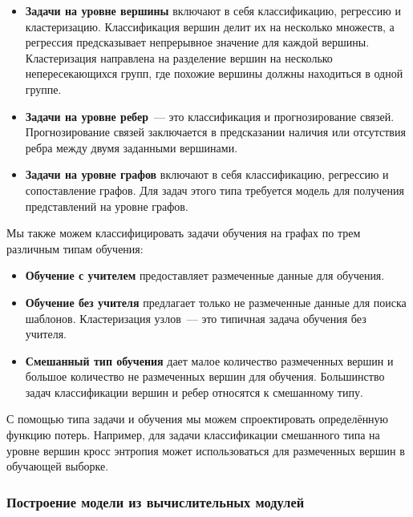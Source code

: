 \documentclass[12pt]{article}
\begin{document}
\begin{itemize}
    \item \textbf{Задачи на уровне вершины} включают в себя классификацию, регрессию и кластеризацию. Классификация вершин делит их на несколько множеств, а регрессия предсказывает непрерывное значение для каждой вершины. Кластеризация направлена на разделение вершин на несколько непересекающихся групп, где похожие вершины должны находиться в одной группе. 
    
    \item \textbf{Задачи на уровне ребер}~--- это классификация и прогнозирование связей. Прогнозирование связей заключается в предсказании наличия или отсутствия ребра между двумя заданными вершинами. 
    
    \item \textbf{Задачи на уровне графов} включают в себя классификацию, регрессию и сопоставление графов. Для задач этого типа требуется модель для получения представлений на уровне графов. 
\end{itemize}

Мы также можем классифицировать задачи обучения на графах по трем различным типам обучения: 

\begin{itemize}
    \item \textbf{Обучение с учителем} предоставляет размеченные данные для обучения.
    
    \item \textbf{Обучение без учителя} предлагает только не размеченные данные для поиска шаблонов. Кластеризация узлов~--- это типичная задача обучения без учителя. 
    
    \item \textbf{Смешанный тип обучения} дает малое количество размеченных вершин и большое количество не размеченных вершин для обучения. Большинство задач классификации вершин и ребер относятся к смешанному типу.
\end{itemize}

С помощью типа задачи и обучения мы можем спроектировать определённую функцию потерь. Например, для задачи классификации смешанного типа на уровне вершин кросс энтропия может использоваться для размеченных вершин в обучающей выборке.

\subsubsection{Построение модели из вычислительных модулей}
\end{document}
